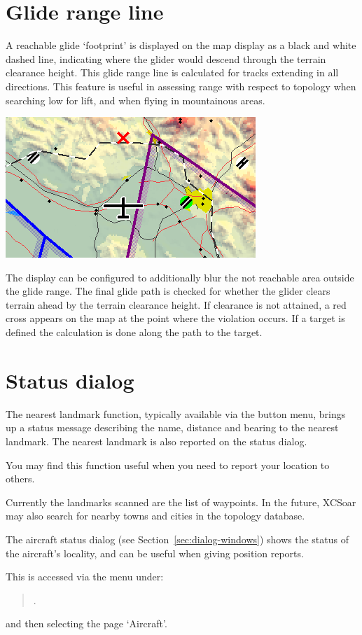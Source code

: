 \section{Glide range line}

A reachable glide `footprint' is displayed on the map display as a black and
white dashed line, indicating where the glider would descend through the
terrain clearance height.  This glide range line is calculated for
tracks extending in all directions.  This feature is useful in
assessing range with respect to topology when searching low for lift,
and when flying in mountainous areas.

\begin{center}
\includegraphics[angle=0,width=0.7\linewidth,keepaspectratio='true']{figures/cut-footprint.png}
\end{center}

The display can be configured to additionally blur the not reachable area
outside the glide range. 
The final glide path is checked for whether the glider clears terrain ahead
by the terrain clearance height.  If clearance is not attained, a red
cross appears on the map at the point where the violation occurs. If a target is
defined the calculation is done along the path to the target. 


\section{Status dialog}\label{sec:aircr-stat-dial}

The nearest landmark function, typically available via the button
menu, brings up a status message describing the name, distance and
bearing to the nearest landmark.  The nearest landmark is also
reported on the status dialog.

You may find this function useful when you need to report your
location to others.

Currently the landmarks scanned are the list of waypoints.  In the
future, XCSoar may also search for nearby towns and cities in the
topology database.

The aircraft status dialog (see Section~\ref{sec:dialog-windows})
shows the status of the aircraft's locality, and can be useful when
giving position reports.

This is accessed via the menu under: 
\begin{quote}
\blink{}\blink{}.
\end{quote}
and then selecting the page `Aircraft'.
